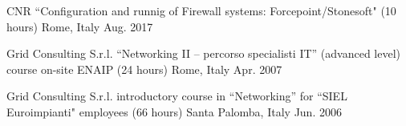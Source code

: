 



\begin{cvhonors}


\cvhonor
{CNR} %
{“Configuration and runnig of Firewall systems: Forcepoint/Stonesoft" (10 hours)} %
{Rome, Italy} %
{Aug. 2017} %

\cvhonor
{Grid Consulting S.r.l.} %
{“Networking II – percorso specialisti IT” (advanced level) course on-site ENAIP (24 hours)}
{Rome, Italy} %
{Apr. 2007} %

\cvhonor
{Grid Consulting S.r.l.}
{introductory course in “Networking” for “SIEL Euroimpianti" employees (66 hours)}
{Santa Palomba, Italy} %
{Jun. 2006} %

\end{cvhonors}



